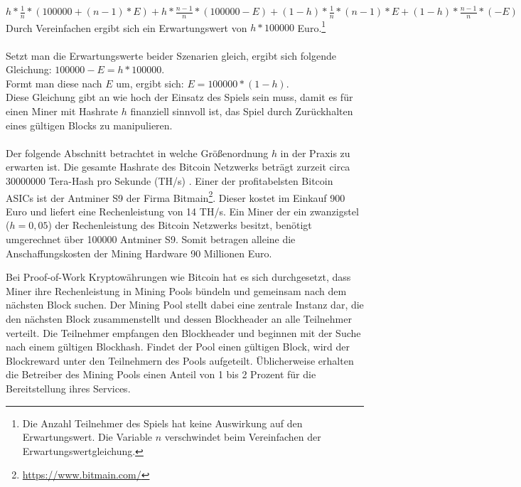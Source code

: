 $h*\frac{1}{n}*(100000 + (n-1)*E) + h*\frac{n-1}{n}*(100000 - E) + (1-h)*\frac{1}{n}*(n-1)*E + (1-h)*\frac{n-1}{n}* (-E)$\\
Durch Vereinfachen ergibt sich ein Erwartungswert von $ h*100000$ Euro.\footnote{Die Anzahl Teilnehmer des Spiels hat keine Auswirkung auf den Erwartungswert. Die Variable $n$ verschwindet beim Vereinfachen der Erwartungswertgleichung.}\\\\
Setzt man die Erwartungswerte beider Szenarien gleich, ergibt sich folgende Gleichung: $100000 - E = h*100000$.\\Formt man diese nach $E$ um, ergibt sich: $E = 100000 * (1-h)$.\\
Diese Gleichung gibt an wie hoch der Einsatz des Spiels sein muss, damit es für einen Miner mit Hashrate $h$ finanziell sinnvoll ist, das Spiel durch Zurückhalten eines gültigen Blocks zu manipulieren.\\\\
Der folgende Abschnitt betrachtet in welche Größenordnung $h$ in der Praxis zu erwarten ist.
Die gesamte Hashrate des Bitcoin Netzwerks beträgt zurzeit circa 30000000 Tera-Hash pro Sekunde (TH/s) \cite{blockchain_info_hashrate}. Einer der profitabelsten Bitcoin ASICs ist der Antminer S9 der Firma Bitmain\footnote{\url{https://www.bitmain.com/}}. Dieser kostet im Einkauf 900 Euro und liefert eine Rechenleistung von 14 TH/s. Ein Miner der ein zwanzigstel ($h=0,05$) der Rechenleistung des Bitcoin Netzwerks besitzt, benötigt umgerechnet über 100000 Antminer S9. Somit betragen alleine die Anschaffungskosten der Mining Hardware 90 Millionen Euro.

Bei Proof-of-Work Kryptowährungen wie Bitcoin hat es sich durchgesetzt, dass Miner ihre Rechenleistung in Mining Pools bündeln und gemeinsam nach dem nächsten Block suchen. Der Mining Pool stellt dabei eine zentrale Instanz dar, die den nächsten Block zusammenstellt und dessen Blockheader an alle Teilnehmer verteilt. Die Teilnehmer empfangen den Blockheader und beginnen mit der Suche nach einem gültigen Blockhash. Findet der Pool einen gültigen Block, wird der Blockreward unter den Teilnehmern des Pools aufgeteilt. Üblicherweise erhalten die Betreiber des Mining Pools einen Anteil von 1 bis 2 Prozent für die Bereitstellung ihres Services.

